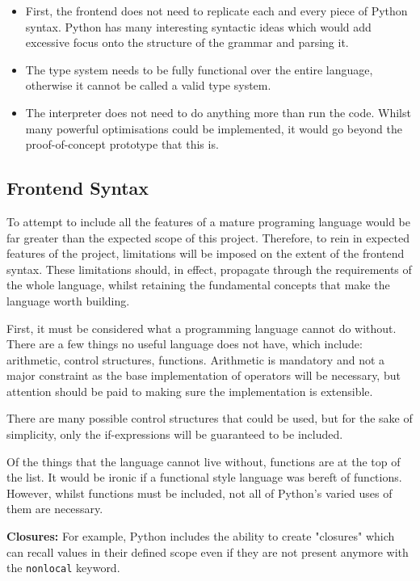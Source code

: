 \documentclass{l4proj}
\begin{document}
\begin{itemize}
    \item First, the frontend does not need to replicate each and every piece of Python syntax.
    Python has many interesting syntactic ideas which would add excessive focus onto the structure of the grammar and parsing it. 
    \item The type system needs to be fully functional over the entire language, otherwise it cannot be called a valid type system.
    \item The interpreter does not need to do anything more than run the code.
    Whilst many powerful optimisations could be implemented, it would go beyond the proof-of-concept prototype that this is.
\end{itemize}

\subsection{Frontend Syntax}

To attempt to include all the features of a mature programing language would be far greater than the expected scope of this project.
Therefore, to rein in expected features of the project, limitations will be imposed on the extent of the frontend syntax.
These limitations should, in effect, propagate through the requirements of the whole language, whilst retaining the fundamental concepts that make the language worth building.

First, it must be considered what a programming language cannot do without.
There are a few things no useful language does not have, which include: arithmetic, control structures, functions.
Arithmetic is mandatory and not a major constraint as the base implementation of operators will be necessary, but attention should be paid to making sure the implementation is extensible.

There are many possible control structures that could be used, but for the sake of simplicity, only the if-expressions will be guaranteed to be included. 

Of the things that the language cannot live without, functions are at the top of the list.
It would be ironic if a functional style language was bereft of functions.
However, whilst functions must be included, not all of Python's varied uses of them are necessary.

\textbf{Closures: }For example, Python includes the ability to create "closures" which can recall values in their defined scope even if they are not present anymore with the \texttt{nonlocal} keyword.
\end{document}
